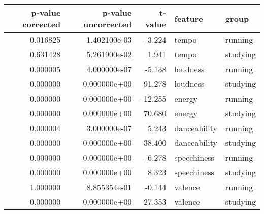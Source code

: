 \begin{tabular}{rrrll}
\toprule
 p-value corrected &  p-value uncorrected &  t-value &       feature &     group \\
\midrule
          0.016825 &         1.402100e-03 &   -3.224 &         tempo &   running \\
          0.631428 &         5.261900e-02 &    1.941 &         tempo &  studying \\
          0.000005 &         4.000000e-07 &   -5.138 &      loudness &   running \\
          0.000000 &         0.000000e+00 &   91.278 &      loudness &  studying \\
          0.000000 &         0.000000e+00 &  -12.255 &        energy &   running \\
          0.000000 &         0.000000e+00 &   70.680 &        energy &  studying \\
          0.000004 &         3.000000e-07 &    5.243 &  danceability &   running \\
          0.000000 &         0.000000e+00 &   38.400 &  danceability &  studying \\
          0.000000 &         0.000000e+00 &   -6.278 &   speechiness &   running \\
          0.000000 &         0.000000e+00 &    8.323 &   speechiness &  studying \\
          1.000000 &         8.855354e-01 &   -0.144 &       valence &   running \\
          0.000000 &         0.000000e+00 &   27.353 &       valence &  studying \\
\bottomrule
\end{tabular}
